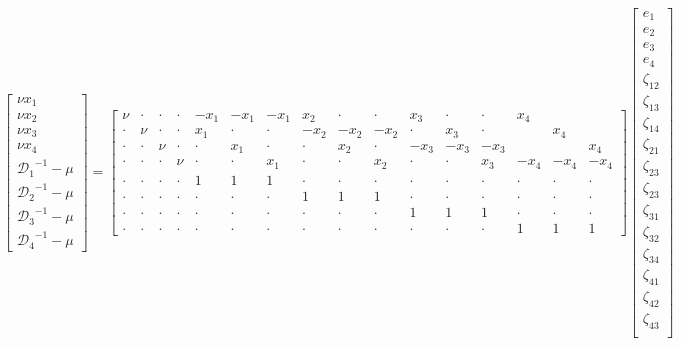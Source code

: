 \begin{equation}
\left[\begin{array}{c}
	         \nu x_1           \\
	         \nu x_2           \\
	         \nu x_3           \\
	         \nu x_4           \\
	{\mathcal{D}_1}^{-1} - \mu \\
	{\mathcal{D}_2}^{-1} - \mu \\
	{\mathcal{D}_3}^{-1} - \mu \\
  {\mathcal{D}_4}^{-1} - \mu
\end{array}\right]
=
\left[\begin{array}{cccccccccccccccc}
	 \nu  & \cdot & \cdot & \cdot & -x_1  & -x_1  & -x_1  &  x_2  & \cdot & \cdot &  x_3  & \cdot & \cdot &  x_4  &       &       \\
	\cdot &  \nu  & \cdot & \cdot &  x_1  & \cdot & \cdot & -x_2  & -x_2  & -x_2  & \cdot &  x_3  & \cdot &       &  x_4  &       \\
	\cdot & \cdot &  \nu  & \cdot & \cdot &  x_1  & \cdot & \cdot &  x_2  & \cdot & -x_3  & -x_3  & -x_3  &       &       &  x_4  \\
	\cdot & \cdot & \cdot &  \nu  & \cdot & \cdot &  x_1  & \cdot & \cdot &  x_2  & \cdot & \cdot &  x_3  & -x_4  & -x_4  & -x_4  \\
	\cdot & \cdot & \cdot & \cdot &   1   &   1   &   1   & \cdot & \cdot & \cdot & \cdot & \cdot & \cdot & \cdot & \cdot & \cdot \\
	\cdot & \cdot & \cdot & \cdot & \cdot & \cdot & \cdot &   1   &   1   &   1   & \cdot & \cdot & \cdot & \cdot & \cdot & \cdot \\
	\cdot & \cdot & \cdot & \cdot & \cdot & \cdot & \cdot & \cdot & \cdot & \cdot &   1   &   1   &   1   & \cdot & \cdot & \cdot \\
	\cdot & \cdot & \cdot & \cdot & \cdot & \cdot & \cdot & \cdot & \cdot & \cdot & \cdot & \cdot & \cdot &   1   &   1   &   1
\end{array}\right]
\left[\begin{array}{c}
	   e_1     \\
	   e_2     \\
	   e_3     \\
     e_4     \\
	\zeta_{12} \\
	\zeta_{13} \\
  \zeta_{14} \\
	\zeta_{21} \\
	\zeta_{23} \\
  \zeta_{23} \\
	\zeta_{31} \\
	\zeta_{32} \\
  \zeta_{34} \\
  \zeta_{41} \\
  \zeta_{42} \\
  \zeta_{43} \\
\end{array}\right]
\end{equation}